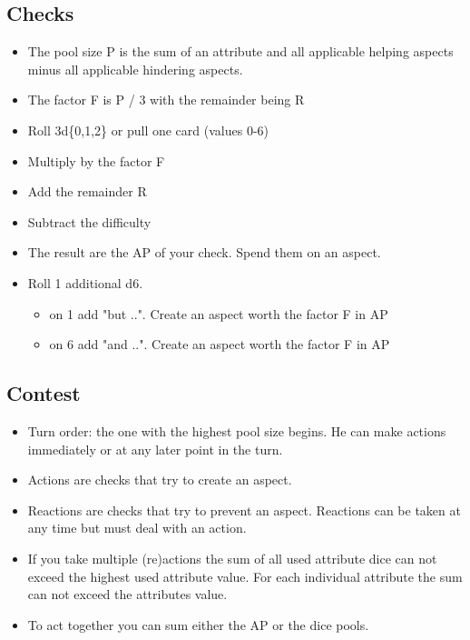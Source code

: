 \documentclass[11pt]{article}
\begin{document}
{\subsection{Checks}
\label{sec:org5368224}
\begin{itemize}
\item The pool size P is the sum of an attribute and all applicable helping aspects minus all applicable hindering aspects.
\item The factor F is P / 3 with the remainder being R
\item Roll 3d\{0,1,2\} or pull one card (values 0-6)
\item Multiply by the factor F
\item Add the remainder R
\item Subtract the difficulty
\item The result are the AP of your check. Spend them on an aspect.
\item Roll 1 additional d6.
\begin{itemize}
\item on 1 add "but ..". Create an aspect worth the factor F in AP
\item on 6 add "and ..". Create an aspect worth the factor F in AP
\end{itemize}
\end{itemize}

\subsection{Contest}
\label{sec:org84c6d56}
\begin{itemize}
\item Turn order: the one with the highest pool size begins. He can make actions immediately or at any later point in the turn.
\item Actions are checks that try to create an aspect.
\item Reactions are checks that try to prevent an aspect. Reactions can be taken at any time but must deal with an action.
\item If you take multiple (re)actions the sum of all used attribute dice can not exceed the highest used attribute value. For each individual attribute the sum can not exceed the attributes value.
\item To act together you can sum either the AP or the dice pools.
\end{itemize}

}
\end{document}
